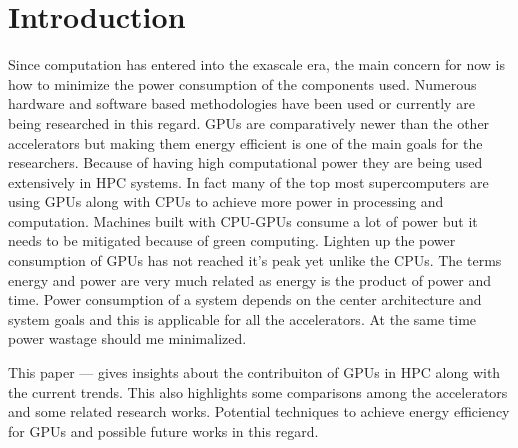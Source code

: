 
\section{Introduction}

Since computation has entered into the exascale era, the main concern for now is how to minimize the power consumption of the components used. Numerous hardware and software based methodologies have been used or currently are being researched in this regard. GPUs are comparatively newer than the other accelerators but making them energy efficient is one of the main goals for the researchers. Because of having high computational power they are being used  extensively in HPC systems. In fact many of the top most supercomputers are using GPUs along with CPUs to achieve more power in processing and computation. Machines built with CPU-GPUs consume a lot of power but it needs to be mitigated because of green computing. Lighten up the power consumption of GPUs has not reached it's peak yet unlike the CPUs. The terms energy and power are very much related as energy is the product of power and time. Power consumption of a system depends on the center architecture and system goals and this is applicable for all the accelerators. At the same time power wastage should me minimalized.

This paper --- gives insights about the contribuiton of GPUs in HPC along with the current trends. This also highlights some comparisons among the accelerators and some related research works. Potential techniques to achieve energy efficiency for GPUs and possible future works in this regard.
